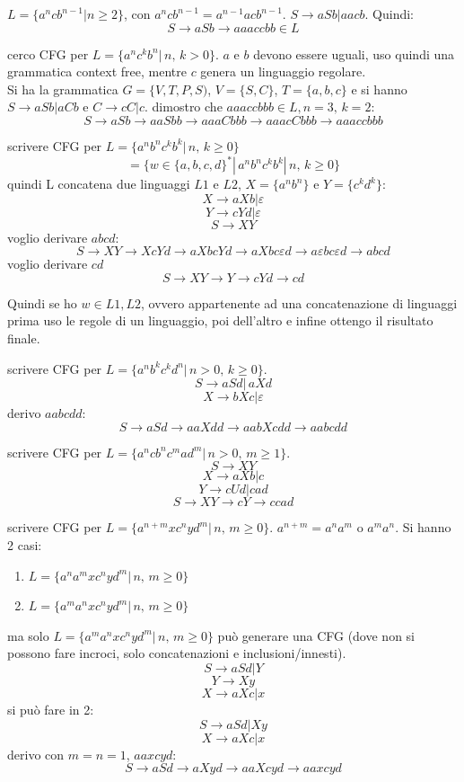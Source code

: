 \begin{example}
	$L=\{a^n c b^{n-1}|n\geq 2\}$, con $a^n c b^{n-1}=a^{n-1}acb^{n-1}$. $S\to aSb|aacb$. Quindi:
	$$S\to aSb\to aaaccbb\in L$$
\end{example}
\begin{example}
	cerco CFG per $L=\{a^n c^k b^n|\,n,\,k>0\}$. $a$ e $b$ devono essere uguali, uso quindi una grammatica context free, mentre $c$ genera un linguaggio regolare.\\
	Si ha la grammatica $G=\{V,T,P,S)$, $V=\{S,C\}$, $T=\{a,b,c\}$ e si hanno $S\to aSb|aCb$ e $C\to cC|c$. dimostro che $aaaccbbb\in L, n=3,\, k=2$:
	$$S\to aSb \to aaSbb\to aaaCbbb\to aaacCbbb\to aaaccbbb$$
\end{example}
\begin{example}
	scrivere CFG per $L=\{a^nb^nc^kb^k|\, n,\,k\geq 0\}
	$
	$$=\{w\in\{a,b,c,d\}^*|\,a^nb^nc^kb^k|\, n,\,k\geq 0\}$$
	quindi L concatena due linguaggi $L1$ e $L2$, $X=\{a^nb^n\}$ e $Y=\{c^kd^k\}$:
	$$X\to aXb | \varepsilon$$
	$$Y\to cYd | \varepsilon$$
	$$S\to XY$$
	voglio derivare $abcd$:
	$$S\to XY \to XcYd\to aXbcYd\to aXbc\varepsilon d\to a\varepsilon bc\varepsilon d\to abcd$$
	voglio derivare $cd$
	$$S\to XY\to Y\to cYd\to cd$$
\end{example}
Quindi se ho $w\in L1, L2$, ovvero appartenente ad una concatenazione di linguaggi prima uso le regole di un linguaggio, poi dell'altro e infine ottengo il risultato finale.\\
\begin{example}
	scrivere CFG per $L=\{a^nb^kc^kd^n|\, n>0,\, k\geq 0\}
	$.
	$$S\to aSd|\, aXd$$
	$$X\to bXc| \varepsilon$$
	derivo $aabcdd$:
	$$S\to aSd\to aaXdd\to aabXcdd\to aabcdd$$
\end{example}
\begin{example}
	scrivere CFG per $L=\{a^ncb^nc^mad^m|\, n>0,\, m\geq 1\}
	$.
	$$S\to XY$$
	$$X\to aXb|c$$
	$$Y\to cUd| cad$$
	$$S\to XY\to cY\to ccad$$
\end{example}
\begin{example}
	scrivere CFG per $L=\{a^{n+m}xc^nyd^m|\, n,\, m\geq 0\}
	$. $a^{n+m}=a^na^m \mbox{ o } a^ma^n$. Si hanno 2 casi:
	\begin{enumerate}
		\item $L=\{a^na^m xc^nyd^m|\, n,\, m\geq 0\}
		      $
		\item $L=\{a^ma^n xc^nyd^m|\, n,\, m\geq 0\}
		      $
	\end{enumerate}
	ma solo  $L=\{a^ma^n xc^nyd^m|\, n,\, m\geq 0\}
	$ può generare una CFG (dove non si possono fare incroci, solo concatenazioni e inclusioni/innesti).
	$$S\to aSd| Y$$
	$$Y\to Xy$$
	$$X\to aXc|x$$
	si può fare in 2:
	$$S\to aSd| Xy$$
	$$X\to aXc|x$$
	derivo con $m=n=1$, $aaxcyd$:
	$$S\to aSd\to aXyd\to aaXcyd\to aaxcyd$$
\end{example}

